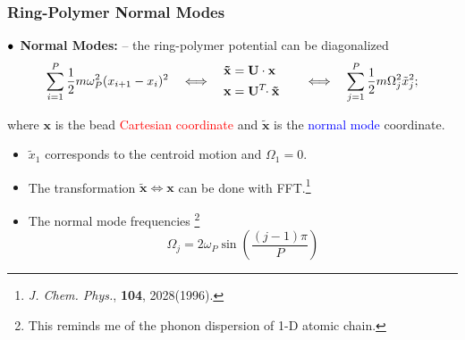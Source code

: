 \begin{frame}
  \frametitle{Ring-Polymer Normal Modes}
  $\bullet\kern1ex$\textbf{Normal Modes:} -- the ring-polymer potential can be diagonalized 
  \begin{equation*}
    \sum_{i=1}^P\frac{1}{2} m\omega_P^2(x_{i+1} - x_i)^2 
    \quad\Longleftrightarrow\quad
    \begin{aligned}
        \mathbf{\tilde{x}} &= \mathbf{U}\cdot \mathbf{x}\cr
        \mathbf{x} &= \mathbf{U}^T\!\!\cdot \mathbf{\tilde{x}}\cr
    \end{aligned}
    \quad\Longleftrightarrow\quad
    \sum_{j=1}^{P}\frac{1}{2} m\Omega_j^2\tilde{x}_j^2;
  \end{equation*}

  where $\mathbf{x}$ is the bead \textcolor{red}{Cartesian coordinate} and $\tilde{\mathbf{x}}$ is the \textcolor{blue}{normal mode}
  coordinate.

  \begin{multicols}{2}
    \begin{itemize}
        \item $\tilde{x}_1$ corresponds to the centroid motion and $\Omega_1 = 0$.
        \item The transformation $\mathbf{\tilde{x}} \Leftrightarrow \mathbf{x}$
          can be done with FFT.\footnote[frame]{
            \textit{J. Chem. Phys.}, \textbf{104}, 2028(1996).
          }
        \item The normal mode frequencies
        \footnote[frame]{
            This reminds me of the phonon dispersion of 1-D atomic chain.
        }
        \begin{equation*}
            \Omega_j = 2\omega_P \sin\left({\frac{(j-1)\pi}{P}}\right)
        \end{equation*}


\end{itemize}
\end{multicols}
\end{frame}
